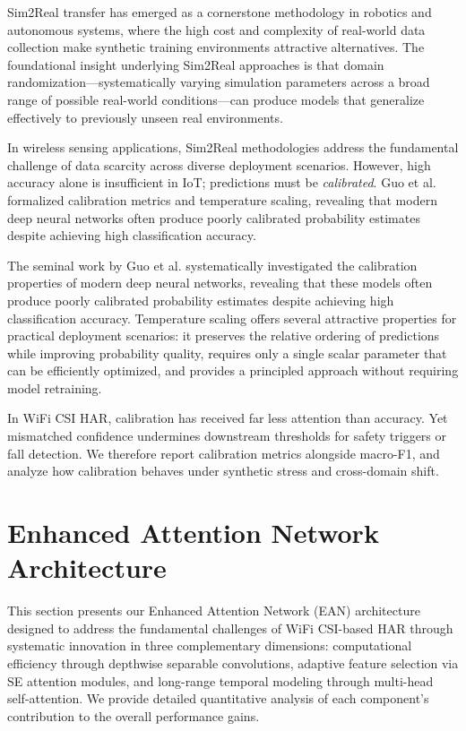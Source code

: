 \documentclass[lettersize,journal]{IEEEtran}
\begin{document}
Sim2Real transfer has emerged as a cornerstone methodology in robotics and autonomous systems, where the high cost and complexity of real-world data collection make synthetic training environments attractive alternatives. The foundational insight underlying Sim2Real approaches is that domain randomization—systematically varying simulation parameters across a broad range of possible real-world conditions—can produce models that generalize effectively to previously unseen real environments.

In wireless sensing applications, Sim2Real methodologies address the fundamental challenge of data scarcity across diverse deployment scenarios. However, high accuracy alone is insufficient in IoT; predictions must be \emph{calibrated}. Guo et al.~\cite{calibration_guo2017} formalized calibration metrics and temperature scaling, revealing that modern deep neural networks often produce poorly calibrated probability estimates despite achieving high classification accuracy.

The seminal work by Guo et al. systematically investigated the calibration properties of modern deep neural networks, revealing that these models often produce poorly calibrated probability estimates despite achieving high classification accuracy. Temperature scaling offers several attractive properties for practical deployment scenarios: it preserves the relative ordering of predictions while improving probability quality, requires only a single scalar parameter that can be efficiently optimized, and provides a principled approach without requiring model retraining.

In WiFi CSI HAR, calibration has received far less attention than accuracy. Yet mismatched confidence undermines downstream thresholds for safety triggers or fall detection. We therefore report calibration metrics alongside macro-F1, and analyze how calibration behaves under synthetic stress and cross-domain shift.

\section{Enhanced Attention Network Architecture}

This section presents our Enhanced Attention Network (EAN) architecture designed to address the fundamental challenges of WiFi CSI-based HAR through systematic innovation in three complementary dimensions: computational efficiency through depthwise separable convolutions, adaptive feature selection via SE attention modules, and long-range temporal modeling through multi-head self-attention. We provide detailed quantitative analysis of each component's contribution to the overall performance gains.
\end{document}
